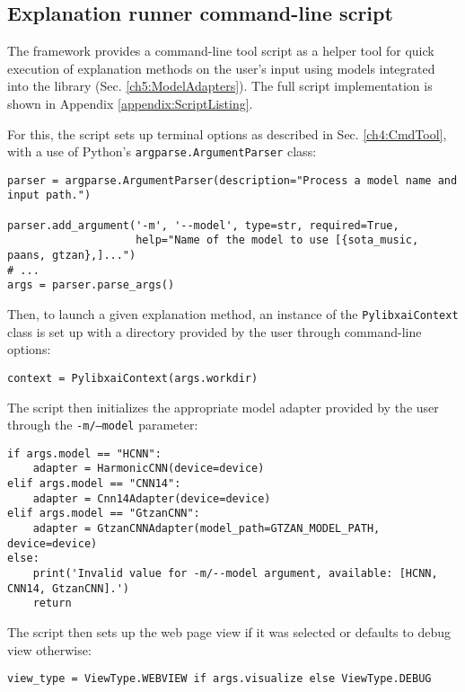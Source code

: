 \documentclass[
    bindingoffset=5mm,  %
    footnoteindent=3mm, %
    hyphenation=true    %
]{src/wut-thesis}
\begin{document}
\clearpage %
\subsection{Explanation runner command-line script} \label{ch5:ExplanationRunner}

The framework provides a command-line tool script as a helper tool for quick execution
of explanation methods on the user’s input using models integrated into the library
(Sec. \ref{ch5:ModelAdapters}). The full script implementation
is shown in Appendix \ref{appendix:ScriptListing}.

For this, the script sets up terminal options as described in Sec. \ref{ch4:CmdTool}, with a use of Python's \texttt{argparse.ArgumentParser} class:
\begin{verbatim}
parser = argparse.ArgumentParser(description="Process a model name and input path.")
    
parser.add_argument('-m', '--model', type=str, required=True,
                    help="Name of the model to use [{sota_music, paans, gtzan},]...")
# ...
args = parser.parse_args()
\end{verbatim}

Then, to launch a given explanation method, an instance of the \texttt{PylibxaiContext} class
is set up with a directory provided by the user through command-line options:

\begin{verbatim}
context = PylibxaiContext(args.workdir)
\end{verbatim}

The script then initializes the appropriate model adapter provided by the user through the \texttt{-m/--model} parameter: 
\begin{verbatim}
if args.model == "HCNN":
    adapter = HarmonicCNN(device=device)
elif args.model == "CNN14":
    adapter = Cnn14Adapter(device=device)
elif args.model == "GtzanCNN":
    adapter = GtzanCNNAdapter(model_path=GTZAN_MODEL_PATH, device=device)
else:
    print('Invalid value for -m/--model argument, available: [HCNN, CNN14, GtzanCNN].')
    return
\end{verbatim}

The script then sets up the web page view if it was selected or defaults to debug view otherwise: 
\begin{verbatim}
view_type = ViewType.WEBVIEW if args.visualize else ViewType.DEBUG
\end{verbatim}
\end{document}

